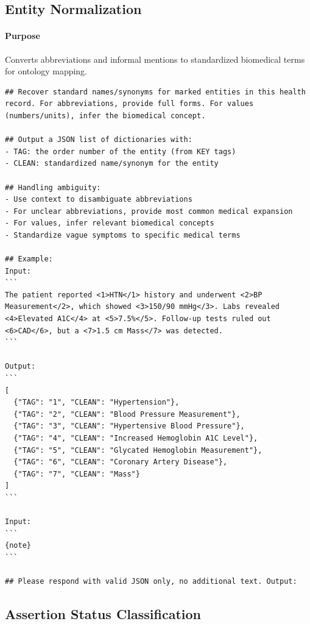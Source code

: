 \subsection{Entity Normalization}
\paragraph{Purpose} Converts abbreviations and informal mentions to standardized biomedical terms for ontology mapping.
\begin{lstlisting}
## Recover standard names/synonyms for marked entities in this health record. For abbreviations, provide full forms. For values (numbers/units), infer the biomedical concept.

## Output a JSON list of dictionaries with:
- TAG: the order number of the entity (from KEY tags)
- CLEAN: standardized name/synonym for the entity

## Handling ambiguity:
- Use context to disambiguate abbreviations
- For unclear abbreviations, provide most common medical expansion
- For values, infer relevant biomedical concepts
- Standardize vague symptoms to specific medical terms

## Example:
Input:
```
The patient reported <1>HTN</1> history and underwent <2>BP Measurement</2>, which showed <3>150/90 mmHg</3>. Labs revealed <4>Elevated A1C</4> at <5>7.5%</5>. Follow-up tests ruled out <6>CAD</6>, but a <7>1.5 cm Mass</7> was detected.
```

Output:
```
[
  {"TAG": "1", "CLEAN": "Hypertension"},
  {"TAG": "2", "CLEAN": "Blood Pressure Measurement"},
  {"TAG": "3", "CLEAN": "Hypertensive Blood Pressure"},
  {"TAG": "4", "CLEAN": "Increased Hemoglobin A1C Level"},
  {"TAG": "5", "CLEAN": "Glycated Hemoglobin Measurement"},
  {"TAG": "6", "CLEAN": "Coronary Artery Disease"},
  {"TAG": "7", "CLEAN": "Mass"}
]
```

Input:
```
{note}
```

## Please respond with valid JSON only, no additional text. Output:
\end{lstlisting}

\subsection{Assertion Status Classification}

